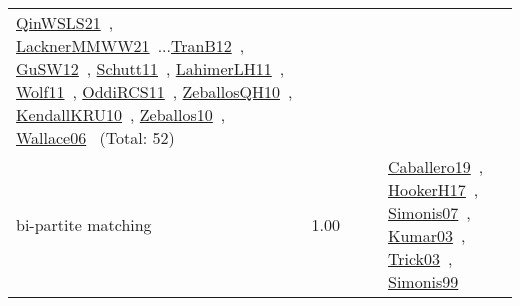 {\begin{longtable}{p{3cm}r>{\raggedright\arraybackslash}p{6cm}>{\raggedright\arraybackslash}p{6cm}>{\raggedright\arraybackslash}p{8cm}}
\href{../works/QinWSLS21.pdf}{QinWSLS21}~\cite{QinWSLS21}, \href{../works/LacknerMMWW21.pdf}{LacknerMMWW21}~\cite{LacknerMMWW21}...\href{../works/TranB12.pdf}{TranB12}~\cite{TranB12}, \href{../works/GuSW12.pdf}{GuSW12}~\cite{GuSW12}, \href{../works/Schutt11.pdf}{Schutt11}~\cite{Schutt11}, \href{../works/LahimerLH11.pdf}{LahimerLH11}~\cite{LahimerLH11}, \href{../works/Wolf11.pdf}{Wolf11}~\cite{Wolf11}, \href{../works/OddiRCS11.pdf}{OddiRCS11}~\cite{OddiRCS11}, \href{../works/ZeballosQH10.pdf}{ZeballosQH10}~\cite{ZeballosQH10}, \href{../works/KendallKRU10.pdf}{KendallKRU10}~\cite{KendallKRU10}, \href{../works/Zeballos10.pdf}{Zeballos10}~\cite{Zeballos10}, \href{../works/Wallace06.pdf}{Wallace06}~\cite{Wallace06} (Total: 52)\\
\index{bi-partite matching}\index{Algorithms!bi-partite matching}bi-partite matching &  1.00 &  &  & \href{../works/Caballero19.pdf}{Caballero19}~\cite{Caballero19}, \href{../works/HookerH17.pdf}{HookerH17}~\cite{HookerH17}, \href{../works/Simonis07.pdf}{Simonis07}~\cite{Simonis07}, \href{../works/Kumar03.pdf}{Kumar03}~\cite{Kumar03}, \href{../works/Trick03.pdf}{Trick03}~\cite{Trick03}, \href{../works/Simonis99.pdf}{Simonis99}~\cite{Simonis99}\\

\end{longtable}}
